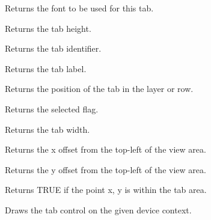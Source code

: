 
Returns the font to be used for this tab.



Returns the tab height.



Returns the tab identifier.



Returns the tab label.



Returns the position of the tab in the layer or row.



Returns the selected flag.



Returns the tab width.



Returns the x offset from the top-left of the view area.



Returns the y offset from the top-left of the view area.



Returns TRUE if the point x, y is within the tab area.



Draws the tab control on the given device context.


